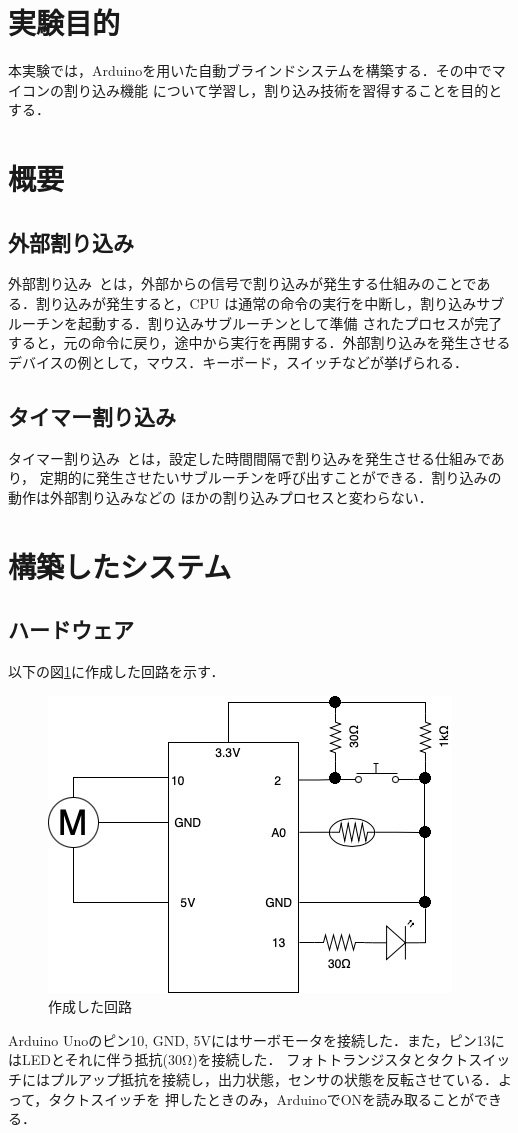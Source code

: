 \documentclass[a4paper,11pt]{jsarticle}
\begin{document}
\section{実験目的}
本実験では，Arduinoを用いた自動ブラインドシステムを構築する．その中でマイコンの割り込み機能
について学習し，割り込み技術を習得することを目的とする．
\section{概要}
\subsection{外部割り込み}
外部割り込み~\cite{interrupt1}とは，外部からの信号で割り込みが発生する仕組みのことである．割り込みが発生すると，CPU
は通常の命令の実行を中断し，割り込みサブルーチンを起動する．割り込みサブルーチンとして準備
されたプロセスが完了すると，元の命令に戻り，途中から実行を再開する．外部割り込みを発生させる
デバイスの例として，マウス．キーボード，スイッチなどが挙げられる．
\subsection{タイマー割り込み}
タイマー割り込み~\cite{interrupt2}とは，設定した時間間隔で割り込みを発生させる仕組みであり，
定期的に発生させたいサブルーチンを呼び出すことができる．割り込みの動作は外部割り込みなどの
ほかの割り込みプロセスと変わらない．

\section{構築したシステム}

\subsection{ハードウェア}
以下の図\ref{P:circuit}に作成した回路を示す．
\begin{figure}[H]
  \centering
  \includegraphics[width=0.7\linewidth]{Circuit.jpg}
  \caption{作成した回路}
  \label{P:circuit}
\end{figure}
Arduino Unoのピン10, GND, 5Vにはサーボモータを接続した．また，ピン13にはLEDとそれに伴う抵抗($30\si{\ohm}$)を接続した．
フォトトランジスタとタクトスイッチにはプルアップ抵抗を接続し，出力状態，センサの状態を反転させている．よって，タクトスイッチを
押したときのみ，ArduinoでONを読み取ることができる．
\end{document}
